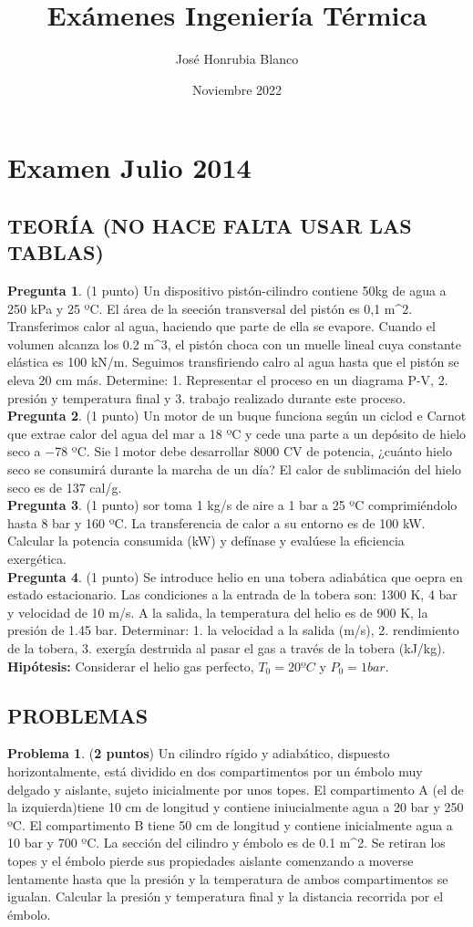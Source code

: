 \documentclass[12pt]{article}
\title{Exámenes Ingeniería Térmica}
\author{José Honrubia Blanco }
\date{Noviembre 2022}
\begin{document}
\section{Examen Julio 2014}
\subsection{TEORÍA (NO HACE FALTA USAR LAS TABLAS)}
\textbf{Pregunta 1}. (1 punto) Un dispositivo pistón-cilindro contiene 50kg de agua a 250 kPa y 25 ºC. El área de la seeción transversal del pistón es 0,1 m^{2}. Transferimos calor al agua, haciendo que parte de ella se evapore. Cuando el volumen alcanza los 0.2 m^{3}, el pistón choca con un muelle lineal cuya constante elástica es 100 kN/m. Seguimos transfiriendo calro al agua hasta que el pistón se eleva 20 cm más. Determine: 1. Representar el proceso en un diagrama P-V, 2. presión y temperatura final y 3. trabajo realizado durante este proceso. 
\\ 
\textbf{Pregunta 2}. (1 punto) Un motor de un buque funciona según un ciclod e Carnot que extrae calor del agua del mar a 18 ºC y cede una parte a un depósito de hielo seco a $-$78 ºC. Sie l motor debe desarrollar 8000 CV de potencia, ¿cuánto hielo seco se consumirá durante la marcha de un día? El calor de sublimación del hielo seco es de 137 cal/g.
\\
\textbf{Pregunta 3}. (1 punto) sor toma 1 kg/s de aire a 1 bar a 25 ºC comprimiéndolo hasta 8 bar y 160 ºC. La transferencia de calor a su entorno es de 100 kW. Calcular la potencia consumida (kW) y defínase y evalúese la eficiencia exergética.
\\
\textbf{Pregunta 4}. (1 punto) Se introduce helio en una tobera adiabática que oepra en estado estacionario. Las condiciones a la entrada de la tobera son: 1300 K, 4 bar y velocidad de 10 m/s. A la salida, la temperatura del helio es de 900 K, la presión de 1.45 bar. Determinar: 
1. la velocidad a la salida (m/s), 2. rendimiento de la tobera, 3. exergía destruida al pasar el gas a través de la tobera (kJ/kg). \\
\textbf{Hipótesis:} Considerar el helio gas perfecto, $T_{0} = 20ºC$ y $P_{0} = 1 bar$.

\subsection{PROBLEMAS}
\textbf{Problema 1}. (\textbf{2 puntos}) Un cilindro rígido y adiabático, dispuesto horizontalmente, está dividido en dos compartimentos por un émbolo muy delgado y aislante, sujeto inicialmente por unos topes. El compartimento A (el de la izquierda)tiene 10 cm de longitud
y contiene iniucialmente agua a 20 bar y 250 ºC. El compartimento B tiene 50 cm de longitud y contiene inicialmente agua a 10 bar y 700 ºC. La sección del cilindro y émbolo es de 0.1 m^{2}. Se retiran los topes y el émbolo pierde sus propiedades aislante comenzando a moverse lentamente hasta que la presión y la temperatura de ambos compartimentos se igualan. Calcular la presión y temperatura final y la distancia recorrida por el émbolo.
\end{document}
